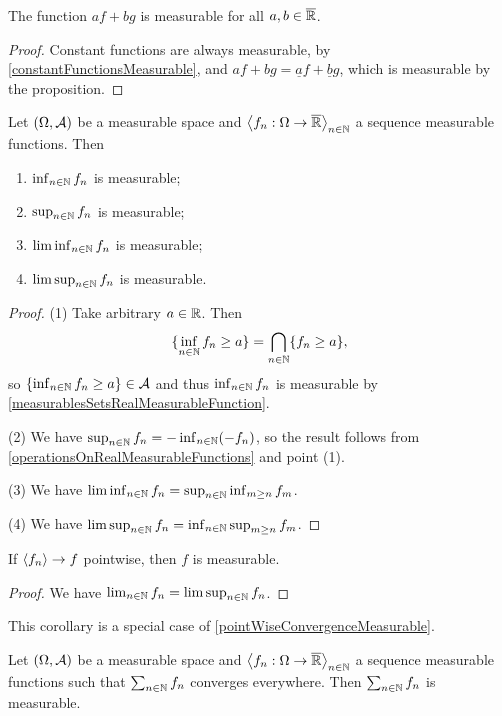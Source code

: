 \begin{corollary}
The function $af+bg$ is measurable for all $a,b\in\overline{\mathbb{R}}$.
\end{corollary}
\begin{proof}
Constant functions are always measurable, by \ref{constantFunctionsMeasurable}, and $af + bg = \underline{a}f + \underline{b}g$, which is measurable by the proposition.
\end{proof}

\begin{proposition} \label{limitOperationsOnRealMeasurableFunctions}
Let $\sSet{\Omega, \mathcal{A}}$ be a measurable space and $\left\langle f_n: \Omega \to \overline{\mathbb{R}} \right\rangle_{n\in\mathbb{N}}$ a sequence measurable functions. Then
\begin{enumerate}
\item $\inf_{n\in\mathbb{N}}f_n$ is measurable;
\item $\sup_{n\in\mathbb{N}}f_n$ is measurable;
\item $\liminf_{n\in\mathbb{N}}f_n$ is measurable;
\item $\limsup_{n\in\mathbb{N}}f_n$ is measurable.
\end{enumerate}
\end{proposition}
\begin{proof}
(1) Take arbitrary $a\in\mathbb{R}$. Then
\[ \{\inf_{n\in\mathbb{N}}f_n \geq a\} = \bigcap_{n\in\mathbb{N}}\{f_n \geq a\}, \]
so $\{\inf_{n\in\mathbb{N}}f_n \geq a\} \in \mathcal{A}$ and thus $\inf_{n\in\mathbb{N}}f_n$ is measurable by \ref{measurablesSetsRealMeasurableFunction}.

(2) We have $\sup_{n\in\mathbb{N}}f_n = -\inf_{n\in\mathbb{N}}(-f_n)$, so the result follows from \ref{operationsOnRealMeasurableFunctions} and point (1).

(3) We have $\liminf_{n\in\mathbb{N}}f_n = \sup_{n\in\mathbb{N}} \inf_{m\geq n}f_m$.

(4) We have $\limsup_{n\in\mathbb{N}}f_n = \inf_{n\in\mathbb{N}} \sup_{m\geq n}f_m$.
\end{proof}
\begin{corollary} \label{pointwiseLimitMeasurable}
If $\left\langle f_n \right\rangle\to f$ pointwise, then $f$ is measurable.
\end{corollary}
\begin{proof}
We have $\lim_{n\in\mathbb{N}}f_n = \limsup_{n\in\mathbb{N}}f_n$.
\end{proof}
This corollary is a special case of \ref{pointWiseConvergenceMeasurable}.
\begin{corollary} \label{infiniteSumMeasurable}
Let $\sSet{\Omega, \mathcal{A}}$ be a measurable space and $\left\langle f_n: \Omega \to \overline{\mathbb{R}} \right\rangle_{n\in\mathbb{N}}$ a sequence measurable functions such that $\sum_{n\in\mathbb{N}}f_n$ converges everywhere. Then $\sum_{n\in\mathbb{N}}f_n$ is measurable.
\end{corollary}


